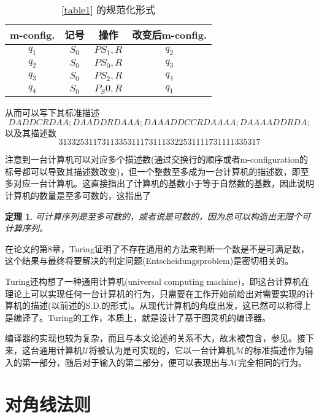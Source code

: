 \documentclass[8pt]{article}
\newtheorem{theorem}{定理}
\begin{document}
\begin{table}[h]
	\centering
	\begin{tabular}{cccc}
		m-config. & 记号 & 操作 & 改变后m-config. \\
		\hline
		$q_1$ & $S_0$ & $PS_1, R$ & $q_2$\\
		$q_2$ & $S_0$ & $PS_0, R$ & $q_3$\\
		$q_3$ & $S_0$ & $PS_2, R$ & $q_4$\\
		$q_4$ & $S_0$ & $P_S0, R$ & $q_1$\\
	\end{tabular}
	\caption{\cref{table1} 的规范化形式}
	\label{table1.1}
\end{table}
从而可以写下其标准描述
\begin{equation}
DADDCRDAA;DAADDRDAAA;DAAADDCCRDAAAA;DAAAADDRDA;
\end{equation}
以及其描述数
\begin{equation}
31332531173113353111731113322531111731111335317
\end{equation}

注意到一台计算机可以对应多个描述数(通过交换行的顺序或者m-configuration的标号都可以导致其描述数改变)，但一个整数至多成为一台计算机的描述数，即至多对应一台计算机。这直接指出了计算机的基数小于等于自然数的基数，因此说明计算机的数量是至多可数的，这指出了

\begin{theorem}
	可计算序列是至多可数的，或者说是可数的，因为总可以构造出无限个可计算序列。
	\label{seq-countable}
\end{theorem}

在论文的第8章，Turing证明了不存在通用的方法来判断一个数是不是可满足数，这个结果与最终将要解决的判定问题(Entscheidungsproblem)是密切相关的。

Turing还构想了一种通用计算机(universal computing machine)，即这台计算机在理论上可以实现任何一台计算机的行为，只需要在工作开始前给出对需要实现的计算机的描述(以前述的S.D.的形式)。从现代计算机的角度出发，这已然可以称得上是编译了。Turing的工作，本质上，就是设计了基于图灵机的编译器。

编译器的实现也较为复杂，而且与本文论述的关系不大，故未被包含，参见\cite{Turing}。接下来，这台通用计算机$\mathcal U$将被认为是可实现的，它以一台计算机$\mathcal M$的标准描述作为输入的第一部分，随后对于输入的第二部分，便可以表现出与$\mathcal M$完全相同的行为。

\section{对角线法则}
\end{document}
